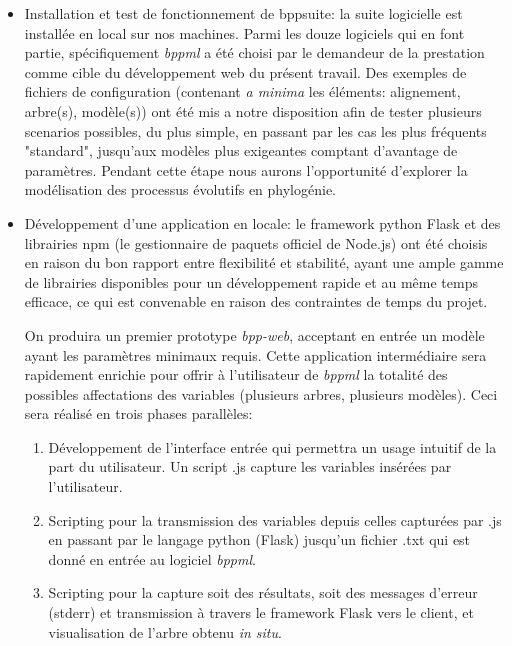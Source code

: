 \begin{itemize}
	\item Installation et test de fonctionnement de bppsuite: la suite logicielle est installée en local sur nos machines. 
	Parmi les douze logiciels qui en font partie, spécifiquement   \textit{bppml} a été choisi par le demandeur de la prestation comme cible 
	du développement web du présent travail. Des exemples de fichiers de configuration (contenant \textit{a minima} les éléments: alignement, arbre(s), modèle(s)) 
	ont été mis a notre disposition  
	afin de tester plusieurs scenarios possibles, du plus simple, en passant par les cas les plus fréquents "standard", 
	jusqu'aux modèles plus exigeantes comptant d'avantage de paramètres. Pendant cette étape nous aurons l'opportunité d'explorer
	 la modélisation des processus évolutifs en phylogénie.
	
	\item Développement d'une application en locale: le framework python Flask et des librairies npm
	(le gestionnaire de paquets officiel de Node.js) 
	ont été choisis en raison du bon rapport entre flexibilité et stabilité, 
	ayant une ample gamme de librairies disponibles pour un développement rapide et au même temps efficace, 
	ce qui est convenable en raison des contraintes de temps du projet.

	On produira un premier prototype  \textit{bpp-web}, acceptant en entrée un modèle ayant les paramètres minimaux requis. 
	Cette application intermédiaire sera rapidement enrichie pour offrir à l'utilisateur de \textit{bppml} la totalité des possibles affectations 
	des variables (plusieurs arbres, plusieurs modèles).
	Ceci sera réalisé en trois phases parallèles:
	\begin{enumerate}
		\item Développement de l'interface entrée qui permettra un usage intuitif de la part du utilisateur. 
		Un script .js capture les variables insérées par l'utilisateur. 
		\item Scripting pour la transmission des variables depuis celles capturées par .js en passant par le langage 
		python (Flask) jusqu'un fichier .txt qui est donné en entrée au logiciel \textit{bppml}.
		\item Scripting pour la capture soit des résultats, soit des messages d'erreur (stderr) et transmission à travers 
		le framework Flask vers le client, et visualisation de l'arbre obtenu \textit{in situ}. 
	\end{enumerate}
	

\end{itemize}
